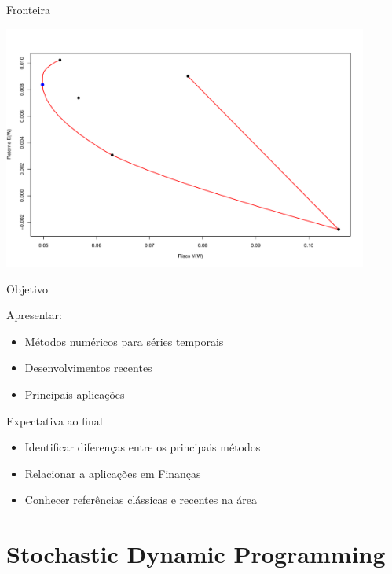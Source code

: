 \documentclass{beamer}
\begin{document}
\begin{frame}{Fronteira}

\begin{center}
 \includegraphics[height=8cm,keepaspectratio]{fronteira_ativos.pdf}
 \end{center}


\end{frame}


\begin{frame}{Objetivo}

Apresentar:

\begin{itemize}
\item Métodos numéricos para séries temporais 
\item Desenvolvimentos recentes
\item Principais aplicações
\end{itemize}

\end{frame}

\begin{frame}{Expectativa ao final}

\begin{itemize}
\item Identificar diferenças entre os principais métodos
\item Relacionar a aplicações em Finanças
\item Conhecer referências clássicas e recentes na área
\end{itemize}

\end{frame}


\section{Stochastic Dynamic Programming}
\end{document}
